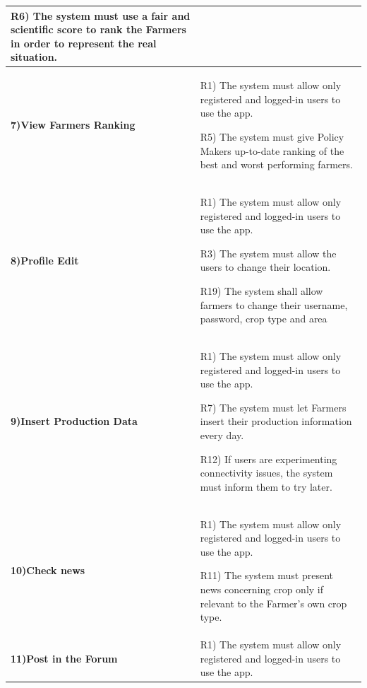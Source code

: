 \documentclass[table, 12pt]{article}
\begin{document}
\begin{itemize}
\begin{longtable}{|p{}|p{}|}
                                                                                           R6) The system must use a fair and scientific score to rank the Farmers in order to represent the real situation.\\\hline
                    \cellcolor{SpringGreen!50}\textbf{7)View Farmers Ranking}\centering &  R1) The system must allow only registered and logged-in users to use the app.

                                                                                           R5) The system must give Policy Makers up-to-date ranking of the best and worst performing farmers.\\\hline
                    \cellcolor{SpringGreen!50}\textbf{8)Profile Edit}\centering &  R1) The system must allow only registered and logged-in users to use the app.

                                                                                   R3) The system must allow the users to change their location.
                                
                                                                                   R19) The system shall allow farmers to change their username, password, crop type and area\\\hline
                    \cellcolor{SpringGreen!50}\textbf{9)Insert Production Data}\centering & R1) The system must allow only registered and logged-in users to use the app.

                                                                                  R7) The system must let Farmers insert their production information every day.
                                                                                  
                                                                                  R12) If users are experimenting connectivity issues, the system must inform them to try later.\\\hline
                    \cellcolor{SpringGreen!50}\textbf{10)Check news}\centering &  R1) The system must allow only registered and logged-in users to use the app.
                                                                       
                                                                                 R11) The system must present news concerning crop only if relevant to the Farmer's own crop type.\\\hline
                    \cellcolor{SpringGreen!50}\textbf{11)Post in the Forum}\centering &  R1) The system must allow only registered and logged-in users to use the app.
                    

\end{longtable}
\end{itemize}
\end{document}
